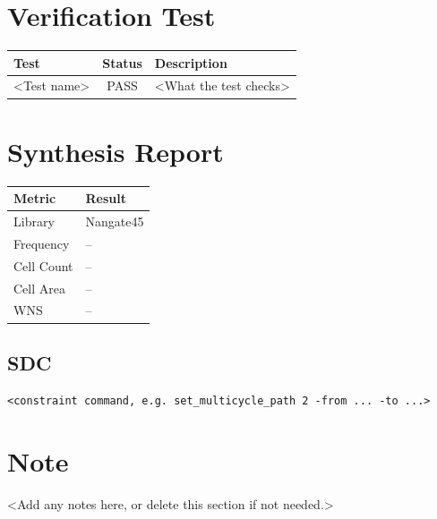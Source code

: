\documentclass[10pt,a4paper]{article}
\begin{document}
\section{Verification Test}
 
\begin{table}[H]
\centering
\begin{tabularx}{\textwidth}{l c X}
\toprule
\textbf{Test} & \textbf{Status} & \textbf{Description} \\
\midrule
<Test name> & PASS & <What the test checks> \\
\bottomrule
\end{tabularx}
\end{table}

\section{Synthesis Report}
 
\begin{table}[H]
\centering
\begin{tabularx}{\textwidth}{l X}
\toprule
\textbf{Metric} & \textbf{Result} \\
\midrule
Library     & Nangate45 \\
Frequency   & -- \\
Cell Count  & -- \\
Cell Area   & -- \\
WNS         & -- \\
\bottomrule
\end{tabularx}
\end{table}
 
\subsection{SDC}
 
\begin{lstlisting}
<constraint command, e.g. set_multicycle_path 2 -from ... -to ...>
\end{lstlisting}
 
 
\section{Note}
 
<Add any notes here, or delete this section if not needed.>
\end{document}
